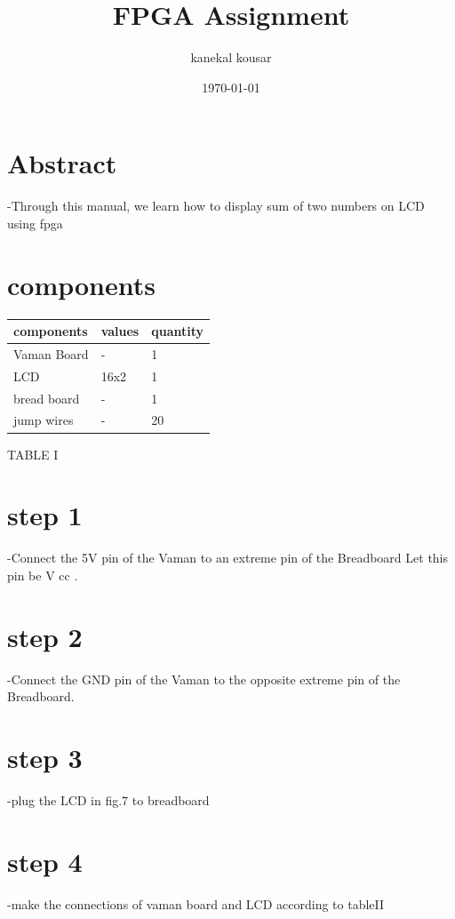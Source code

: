 \documentclass[twocolumn,13pt]{article}
\begin{document}
\title{\textbf{FPGA Assignment}}

\author{kanekal kousar}
\date{\today}
\maketitle

 \section{Abstract}-Through this manual, we learn how to display sum of two numbers on LCD using fpga


\section{components}


\begin{tabular}{ |p{3cm}|p{1.5cm}|p{1.5cm}| }
 \hline
 \setlength{\tabcolsep}{3pt}
components & values & quantity \\
\hline
 Vaman Board &   - & 1\\
 LCD &16x2 & 1\\
 bread board  &-& 1\\
 jump wires&  - & 20\\
 \hline
\end{tabular}
\begin{center}
    TABLE I
\end{center}
 

\section*{step 1}
-Connect the 5V pin of the Vaman to an extreme pin of the Breadboard
Let this pin be V cc .
\section*{step 2}
-Connect the GND pin of the Vaman to the opposite extreme pin of the Breadboard.
\section*{step 3}
-plug the LCD in fig.7 to breadboard
\section*{step 4}
-make the connections of vaman board and LCD according to tableII
\end{document}
